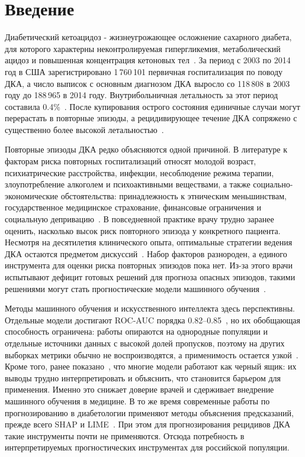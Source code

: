 \documentclass[12pt,a4paper]{article}
\begin{document}
\section{Введение}

Диабетический кетоацидоз - жизнеугрожающее осложнение сахарного диабета, для которого
характерны неконтролируемая гипергликемия, метаболический ацидоз и повышенная
концентрация кетоновых тел~\cite{ref1}. За период с 2003 по 2014 год в США
зарегистрировано 1\,760\,101 первичная госпитализация по поводу ДКА, а число выписок с
основным диагнозом ДКА выросло со 118\,808 в 2003 году до 188\,965 в 2014 году.
Внутрибольничная летальность за этот период составила 0.4\%~\cite{ref2}. После
купирования острого состояния единичные случаи могут перерастать в повторные эпизоды, а
рецидивирующее течение ДКА сопряжено с существенно более высокой
летальностью~\cite{ref3,ref4}.

Повторные эпизоды ДКА редко объясняются одной причиной. В литературе к факторам риска
повторных госпитализаций относят молодой возраст, психиатрические расстройства, инфекции,
несоблюдение режима терапии, злоупотребление алкоголем и психоактивными веществами, а
также социально-экономические обстоятельства: принадлежность к этническим меньшинствам,
государственное медицинское страхование, финансовые ограничения и социальную
депривацию~\cite{ref5,ref6,ref7}. В повседневной практике врачу трудно заранее оценить,
насколько высок риск повторного эпизода у конкретного пациента. Несмотря на десятилетия
клинического опыта, оптимальные стратегии ведения ДКА остаются предметом
дискуссий~\cite{ref8}. Набор факторов разнороден, а единого инструмента для оценки риска
повторных эпизодов пока нет. Из-за этого врачи испытывают дефицит готовых решений для
прогноза опасных эпизодов, такими решениями могут стать прогностические модели машинного
обучения~\cite{ref9}.

Методы машинного обучения и искусственного интеллекта здесь перспективны. Отдельные
модели достигают ROC-AUC порядка 0.82--0.85~\cite{ref9,ref10}, но их обобщающая
способность ограничена: работы опираются на однородные популяции и отдельные источники
данных с высокой долей пропусков, поэтому на других выборках метрики обычно не
воспроизводятся, а применимость остается узкой~\cite{ref10}. Кроме того, ранее
показано~\cite{ref11,ref12}, что многие модели работают как черный ящик: их выводы трудно
интерпретировать и объяснить, что становится барьером для применения. Именно это снижает
доверие врачей и сдерживает внедрение машинного обучения в медицине. В то же время
современные работы по прогнозированию в диабетологии применяют методы объяснения
предсказаний, прежде всего SHAP и LIME~\cite{ref13,ref14}. При этом для прогнозирования
рецидивов ДКА такие инструменты почти не применяются. Отсюда потребность в интерпретируемых
прогностических инструментах для российской популяции.
\end{document}
